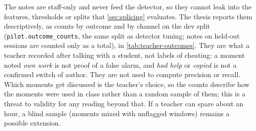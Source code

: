 The notes are staff-only and never feed the detector, so they cannot leak into the
features, thresholds or splits that \cref{sec:splicing} evaluates. The thesis reports
them descriptively, as counts by outcome and by channel on the dev split
(\texttt{pilot.outcome\_counts}, the same split as detector tuning; notes on held-out
sessions are counted only as a total), in \cref{tab:teacher-outcomes}. They are what a
teacher recorded after talking with a student, not labels of cheating: a moment noted
\emph{own work} is not proof of a false alarm, and \emph{had help} or \emph{copied} is
not a confirmed switch of author. They are not used to compute precision or recall.
Which moments get discussed is the teacher's choice, so the counts describe how the
moments were used in class rather than a random sample of them; this is a threat to
validity for any reading beyond that. If a teacher can spare about an hour, a blind
sample (moments mixed with unflagged windows) remains a possible extension.

\begin{table}[ht]
  \centering
  \caption{Conversation outcomes noted by teachers, by detector channel, on the dev
  split. Descriptive counts of what was recorded after a conversation; not labels.}
  \label{tab:teacher-outcomes}
\end{table}

